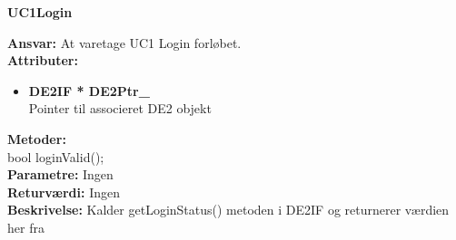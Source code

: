 %
%
{\centering
\textbf{UC1Login}\par
}
\textbf{Ansvar:} At varetage UC1 Login forløbet. \\
\textbf{Attributer:}
\begin{itemize}
	\item \textbf{DE2IF * DE2Ptr\_} \\
	Pointer til associeret DE2 objekt
\end{itemize}
\textbf{Metoder:} \\
bool loginValid(); \\
\textbf{Parametre:} Ingen \\
\textbf{Returværdi:} Ingen \\
\textbf{Beskrivelse:} Kalder getLoginStatus() metoden i DE2IF og returnerer værdien her fra \\
